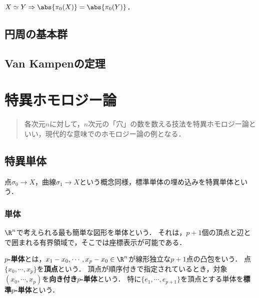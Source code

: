 \documentclass[uplatex, dvipdfmx]{jsreport}
\begin{document}
\begin{corollary}[最初のホモトピー不変量]
    $X\simeq Y\Rightarrow\abs{\pi_0(X)}=\abs{\pi_0(Y)}$．
\end{corollary}


\section{円周の基本群}

\section{Van Kampenの定理}

\chapter{特異ホモロジー論}

\begin{quotation}
    各次元$n$に対して，$n$次元の「穴」の数を数える技法を特異ホモロジー論といい，現代的な意味でのホモロジー論の例となる．
\end{quotation}

\section{特異単体}

\begin{tcolorbox}[colframe=ForestGreen, colback=ForestGreen!10!white,breakable,colbacktitle=ForestGreen!40!white,coltitle=black,fonttitle=\bfseries\sffamily,
title=]
    点$\sigma_0\to X$，曲線$\sigma_1\to X$という概念同様，標準単体の埋め込みを特異単体という．
\end{tcolorbox}

\subsection{単体}

\begin{tcolorbox}[colframe=ForestGreen, colback=ForestGreen!10!white,breakable,colbacktitle=ForestGreen!40!white,coltitle=black,fonttitle=\bfseries\sffamily,
title=]
    $\R^n$で考えられる最も簡単な図形を単体という．
    それは，$p+1$個の頂点と辺とで囲まれる有界領域で，そこでは座標表示が可能である．
\end{tcolorbox}

\begin{notation}
    \textbf{$p$-単体}とは，$x_1-x_0,\cdots,x_p-x_0\in\R^n$が線形独立な$p+1$点の凸包をいう．
    点$\{x_0,\cdots,x_p\}$を\textbf{頂点}という．
    頂点が順序付きで指定されているとき，対象$(x_0,\cdots,x_p)$を\textbf{向き付き$p$-単体}という．
    特に$\{e_1,\cdots,e_{p+1}\}$を頂点とする単体を\textbf{標準$p$-単体}という．
\end{notation}
\end{document}
